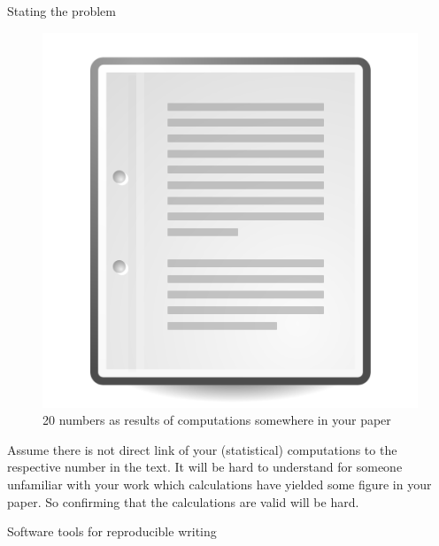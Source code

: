 \documentclass[final,hyperref={pdfpagelabels=false}]{beamer}
\begin{document}
\begin{frame}{}
\begin{columns}[t]
\begin{column}{.48\linewidth}
\begin{block}{Stating the problem}
\begin{minipage}[t]{0.55\textwidth}
\begin{figure}[ht]
             \includegraphics[valign=T,scale=.5]{logo/paper_icon}
                 \caption{ 20 numbers as results of computations somewhere in your paper} 
           \end{figure}
          \end{minipage}   
          \newline
          Assume there is not direct link of your (statistical) computations to the respective number in the text.
          It will be hard to understand for someone unfamiliar with your work which calculations have yielded some figure in your paper. So confirming that the calculations are valid will be hard.  
         \end{block}     

      
      
  \begin{block}{Software tools for reproducible writing}
    

\end{block}
\end{column}
\end{columns}
\end{frame}
\end{document}
